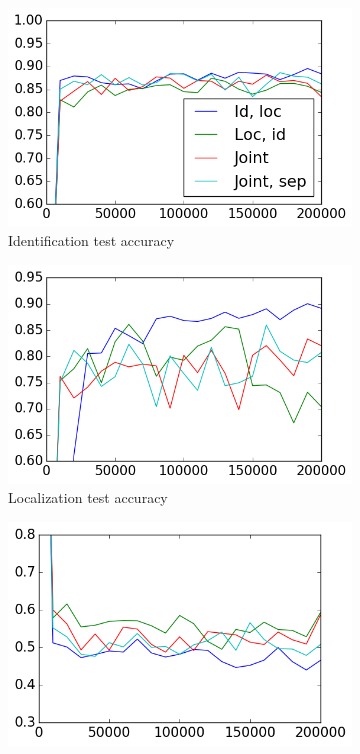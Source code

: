 \begin{figure}[htb]
\begin{subfigure}[t]{0.5\textwidth}
	\centering
	\includegraphics[scale=0.45]{images-architecture-compare/id_test_accuracy}
    \caption{Identification test accuracy}
	\label{fig:results:id_test_accuracy}
\end{subfigure}%
\begin{subfigure}[t]{0.5\textwidth}
	\centering
	\includegraphics[scale=0.45]{images-architecture-compare/loc_test_accuracy}
    \caption{Localization test accuracy}
	\label{fig:results:loc_test_accuracy}
\end{subfigure}
\begin{subfigure}[t]{0.5\textwidth}
	\centering
	\includegraphics[scale=0.45]{images-architecture-compare/id_test_loss}

\end{subfigure}
\end{figure}
